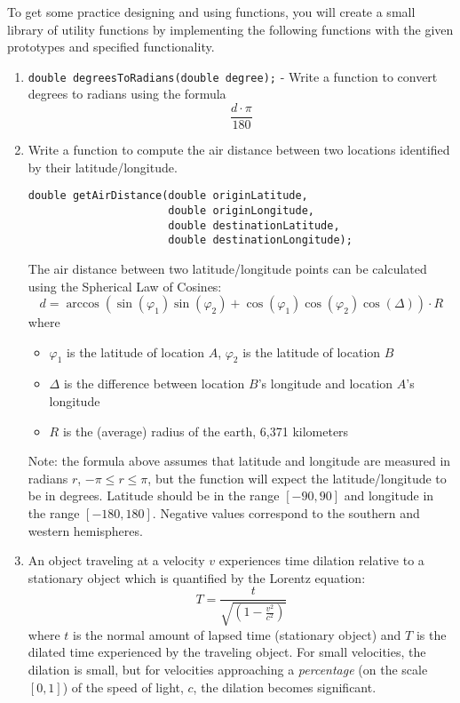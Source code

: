\documentclass[12pt]{scrartcl}
\begin{document}
To get some practice designing and using functions, you will 
create a small library of utility functions by implementing
the following functions with the given prototypes and specified 
functionality.
\begin{enumerate}
  \item \texttt{double degreesToRadians(double degree);} - Write a 
  	function to convert degrees to radians using the formula 
		$$\frac{d\cdot \pi}{180}$$
  \item Write a function to compute the air distance between two locations 
    identified by their latitude/longitude.  
\begin{verbatim}
double getAirDistance(double originLatitude, 
                      double originLongitude, 
                      double destinationLatitude, 
                      double destinationLongitude);
\end{verbatim}  
The air distance between two latitude/longitude points can be calculated 
using the Spherical Law of Cosines:
 $$d = \arccos{(\sin(\varphi_1) \sin(\varphi_2) + \cos(\varphi_1) \cos(\varphi_2) \cos(\Delta) )} \cdot R$$
where
\begin{itemize}
  \item $\varphi_1$ is the latitude of location $A$, $\varphi_2$ is the latitude of location $B$
  \item $\Delta$ is the difference between location $B$'s longitude and location $A$'s longitude
  \item $R$ is the (average) radius of the earth, 6,371 kilometers
\end{itemize}
Note: the formula above assumes that latitude and longitude are measured 
in radians $r$, $-\pi \leq r \leq \pi$, but the function will expect 
the latitude/longitude to be in degrees.  Latitude should be in the range 
$[-90, 90]$ and longitude in the range $[-180, 180]$.  Negative values 
correspond to the southern and western hemispheres.

  \item An object traveling at a velocity $v$ experiences time dilation
  relative to a stationary object which is quantified by the Lorentz equation:
  $$T = \frac{t}{\sqrt{(1-\frac{v^2}{c^2})}}$$
  where $t$ is the normal amount of lapsed time (stationary object) 
  and $T$ is the dilated time experienced by the traveling object.  
  For small velocities, the dilation is small, but for velocities
  approaching a \emph{percentage} (on the scale $[0, 1]$) of the 
  speed of light, $c$, the dilation becomes significant.
  

\end{enumerate}
\end{document}
